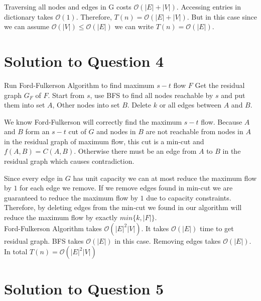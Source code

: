 \documentclass[11pt]{article}
\renewcommand{\O}{\mathcal{O}}
\begin{document}
 Traversing all nodes and edges in G costs $\O(|E| + |V|)$. Accessing entries in dictionary takes $\O(1)$. Therefore, $T(n) = \O(|E| + |V|)$. But in this case since we can assume $\O(|V|) \leq \O(|E|)$ we can write $T(n) = \O(|E|)$.

\newpage
\section{Solution to Question 4}


\begin{algorithm}
	\begin{algorithmic}
		\State Run Ford-Fulkerson Algorithm to find maximum $s-t$ flow $F$
		\State Get the residual graph $G_F$ of $F$.
		\State Start from $s$, use BFS to find all nodes reachable by $s$ and put them into set $A$, Other nodes into set $B$.
		\State Delete $k$ or all edges between $A$ and $B$.
	\end{algorithmic}
\end{algorithm}


We know Ford-Fulkerson will correctly find the maximum $s-t$ flow. Because $A$ and $B$ form an $s-t$ cut of $G$ and nodes in $B$ are not reachable from nodes in $A$ in the residual graph of maximum flow, this cut is a min-cut and $f(A, B) = C(A, B)$. Otherwise there must be an edge from $A$ to $B$ in the residual graph which causes contradiction.

Since every edge in $G$ has unit capacity we can at most reduce the maximum flow by $1$ for each edge we remove. If we remove edges found in min-cut we are guaranteed to reduce the maximum flow by $1$ due to capacity constraints. Therefore, by deleting edges from the min-cut we found in our algorithm will reduce the maximum flow by exactly $min\{k, |F|\}$.\\

 Ford-Fulkerson Algorithm takes $\O(|E|^2|V|)$. It takes $\O(|E|)$ time to get residual graph. BFS takes $\O(|E|)$ in this case. Removing edges takes $\O(|E|)$. In total $T(n) = \O(|E|^2|V|)$

\newpage
\section{Solution to Question 5} 
{}
\end{document}
